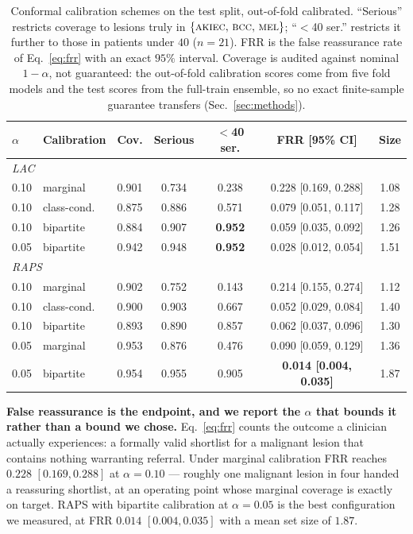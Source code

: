\documentclass[journal]{IEEEtran}
\newcommand{\escset}{\{\textsc{akiec},\,\textsc{bcc},\,\textsc{mel}\}}
\begin{document}
\begin{table}[t]
\centering
\caption{Conformal calibration schemes on the test split, out-of-fold calibrated. ``Serious''
restricts coverage to lesions truly in $\escset$; ``$<$40 ser.'' restricts it further to
those in patients under $40$ ($n=21$). FRR is the false reassurance rate of
Eq.~\eqref{eq:frr} with an exact $95\%$ interval. Coverage is audited against nominal
$1-\alpha$, not guaranteed: the out-of-fold calibration scores come from five fold models and
the test scores from the full-train ensemble, so no exact finite-sample guarantee transfers
(Sec.~\ref{sec:methods}).}
\label{tab:bipartite}
\setlength{\tabcolsep}{4pt}
\begin{tabular}{llccccc}
\toprule
$\alpha$ & Calibration & Cov. & Serious & $<$40 ser. & FRR [95\% CI] & Size \\
\midrule
\multicolumn{7}{l}{\textit{LAC}} \\
0.10 & marginal     & 0.901 & 0.734 & 0.238 & 0.228 [0.169, 0.288] & 1.08 \\
0.10 & class-cond.  & 0.875 & 0.886 & 0.571 & 0.079 [0.051, 0.117] & 1.28 \\
0.10 & bipartite    & 0.884 & 0.907 & \textbf{0.952} & 0.059 [0.035, 0.092] & 1.26 \\
0.05 & bipartite    & 0.942 & 0.948 & \textbf{0.952} & 0.028 [0.012, 0.054] & 1.51 \\
\midrule
\multicolumn{7}{l}{\textit{RAPS}} \\
0.10 & marginal     & 0.902 & 0.752 & 0.143 & 0.214 [0.155, 0.274] & 1.12 \\
0.10 & class-cond.  & 0.900 & 0.903 & 0.667 & 0.052 [0.029, 0.084] & 1.40 \\
0.10 & bipartite    & 0.893 & 0.890 & 0.857 & 0.062 [0.037, 0.096] & 1.30 \\
0.05 & marginal     & 0.953 & 0.876 & 0.476 & 0.090 [0.059, 0.129] & 1.36 \\
0.05 & bipartite    & 0.954 & 0.955 & 0.905 & \textbf{0.014 [0.004, 0.035]} & 1.87 \\
\bottomrule
\end{tabular}
\end{table}

\textbf{False reassurance is the endpoint, and we report the $\alpha$ that bounds it rather
than a bound we chose.} Eq.~\eqref{eq:frr} counts the outcome a clinician actually
experiences: a formally valid shortlist for a malignant lesion that contains nothing
warranting referral. Under marginal calibration FRR reaches $0.228$ $[0.169, 0.288]$ at
$\alpha=0.10$ --- roughly one malignant lesion in four handed a reassuring shortlist, at an
operating point whose marginal coverage is exactly on target. RAPS with bipartite calibration
at $\alpha=0.05$ is the best configuration we measured, at FRR $0.014$ $[0.004, 0.035]$ with
a mean set size of $1.87$.
\end{document}
